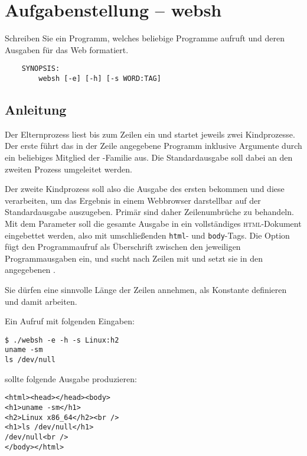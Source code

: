 




\section*{Aufgabenstellung -- websh}

Schreiben Sie ein Programm, welches beliebige Programme aufruft und
deren Ausgaben für das Web formatiert.

\begin{verbatim}
    SYNOPSIS:
        websh [-e] [-h] [-s WORD:TAG]
\end{verbatim}

\subsection*{Anleitung}

Der Elternprozess liest bis zum  Zeilen ein und startet
jeweils zwei Kindprozesse. Der erste führt das in der Zeile angegebene
Programm inklusive Argumente durch ein beliebiges Mitglied der
-Familie aus. Die Standardausgabe soll dabei an den zweiten
Prozess umgeleitet werden.

Der zweite Kindprozess soll also die Ausgabe des ersten bekommen und
diese verarbeiten, um das Ergebnis in einem Webbrowser darstellbar auf
der Standardausgabe auszugeben. Primär sind daher Zeilenumbrüche zu
behandeln. Mit dem Parameter  soll die gesamte Ausgabe in ein
vollständiges \textsc{html}-Dokument eingebettet werden, also mit
umschließenden \verb_html_- und \verb_body_-Tags. Die Option 
fügt den Programmaufruf als Überschrift zwischen den jeweiligen
Programmausgaben ein, und  sucht nach Zeilen mit 
und setzt sie in den angegebenen .

Sie dürfen eine sinnvolle Länge der Zeilen annehmen, als Konstante
definieren und damit arbeiten.

Ein Aufruf mit folgenden Eingaben:

\begin{verbatim}
$ ./websh -e -h -s Linux:h2
uname -sm
ls /dev/null
\end{verbatim}

sollte folgende Ausgabe produzieren:

\begin{verbatim}
<html><head></head><body>
<h1>uname -sm</h1>
<h2>Linux x86_64</h2><br />
<h1>ls /dev/null</h1>
/dev/null<br />
</body></html>
\end{verbatim}

\osueguidelinestwo


